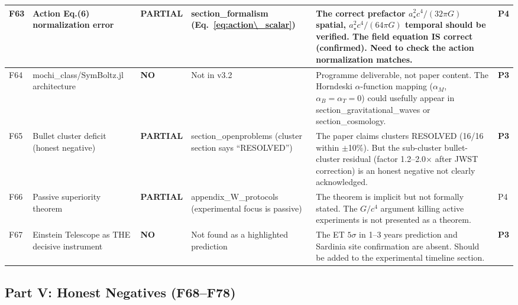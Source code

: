\documentclass[11pt,a4paper]{article}
\newcommand{\PARTIAL}{\textcolor{partial}{\textbf{PARTIAL}}}
\newcommand{\NO}{\textcolor{no}{\textbf{NO}}}
\begin{document}
\begin{longtable}{|p{0.5cm}|p{3.5cm}|p{1.2cm}|p{3.5cm}|p{4.5cm}|p{1cm}|}
F63 & Action Eq.(6) normalization error &
\PARTIAL &
section\_formalism (Eq.~\eqref{eq:action\_scalar}) &
The correct prefactor $a_\star^2 c^4/(32\pi G)$ spatial, $a_\star^2 c^4/(64\pi G)$ temporal should be verified. The field equation IS correct (confirmed). Need to check the action normalization matches. &
P4 \\
\hline

F64 & mochi\_class/SymBoltz.jl architecture &
\NO &
Not in v3.2 &
Programme deliverable, not paper content. The Horndeski $\alpha$-function mapping ($\alpha_M$, $\alpha_B = \alpha_T = 0$) could usefully appear in section\_gravitational\_waves or section\_cosmology. &
\textbf{P3} \\
\hline

F65 & Bullet cluster deficit (honest negative) &
\PARTIAL &
section\_openproblems (cluster section says ``RESOLVED'') &
The paper claims clusters RESOLVED (16/16 within $\pm$10\%). But the sub-cluster bullet-cluster residual (factor 1.2--2.0$\times$ after JWST correction) is an honest negative not clearly acknowledged. &
\textbf{P3} \\
\hline

F66 & Passive superiority theorem &
\PARTIAL &
appendix\_W\_protocols (experimental focus is passive) &
The theorem is implicit but not formally stated. The $G/c^4$ argument killing active experiments is not presented as a theorem. &
P4 \\
\hline

F67 & Einstein Telescope as THE decisive instrument &
\NO &
Not found as a highlighted prediction &
The ET $5\sigma$ in 1--3 years prediction and Sardinia site confirmation are absent. Should be added to the experimental timeline section. &
\textbf{P3} \\
\hline

\end{longtable}


\subsection{Part V: Honest Negatives (F68--F78)}
\end{document}
